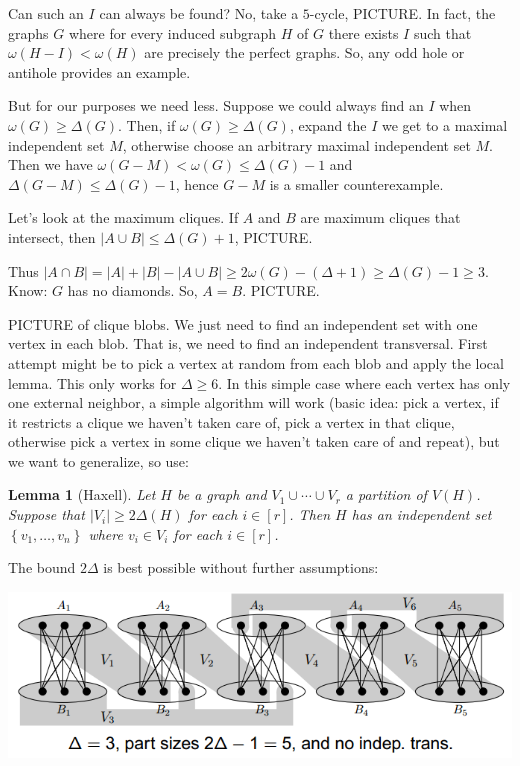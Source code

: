 \documentclass[12pt]{article}
\theoremstyle{plain}
\newtheorem{lem}[thm]{Lemma}
\theoremstyle{definition}
\theoremstyle{remark}
\newcommand{\set}[1]{\left\{ #1 \right\}}
\newcommand{\card}[1]{\left|#1\right|}
\newcommand{\irange}[1]{\left[#1\right]}
\begin{document}
Can such an $I$ can always be found?  No, take a $5$-cycle, PICTURE.  In fact, the graphs $G$ where for every induced subgraph $H$ of $G$ there exists $I$ such that $\omega(H-I) < \omega(H)$ are precisely the perfect graphs.  So, any odd hole or antihole provides an example.

\bigskip

But for our purposes we need less.  Suppose we could always find an $I$ when $\omega(G) \geq \Delta(G)$.  Then, if $\omega(G) \geq \Delta(G)$, expand the $I$ we get to a maximal independent set $M$, otherwise choose an arbitrary maximal independent set $M$.  Then we have $\omega(G-M) < \omega(G) \leq \Delta(G) - 1$ and $\Delta(G-M) \leq \Delta(G) - 1$,  hence $G-M$ is a smaller counterexample.

\bigskip

Let's look at the maximum cliques.  If $A$ and $B$ are maximum cliques that intersect, then $\card{A \cup B} \leq \Delta(G) + 1$, PICTURE. 

Thus $\card{A\cap B} = |A| + |B| - \card{A \cup B} \geq 2\omega(G) - (\Delta + 1) \geq \Delta(G) - 1 \geq 3$. Know: $G$ has no diamonds.  So, $A = B$. PICTURE.

\bigskip

PICTURE of clique blobs.  We just need to find an independent set with one vertex in each blob.  That is, we need to find an independent transversal.  First attempt might be to pick a vertex at random from each blob and apply the local lemma.  This only works for $\Delta \geq 6$.  In this simple case where each vertex has only one external neighbor, a simple algorithm will work (basic idea: pick a vertex, if it restricts a clique we haven't taken care of, pick a vertex in that clique, otherwise pick a vertex in some clique we haven't taken care of and repeat), but we want to generalize, so use:

\begin{lem}[Haxell]\label{HaxellLemma}
Let $H$ be a graph and $V_1 \cup \cdots \cup V_r$ a partition of $V(H)$. Suppose that $\card{V_i} \geq 2\Delta(H)$ for each $i \in \irange{r}$. Then $H$ has an independent set $\set{v_1, \ldots, v_n}$ where $v_i \in V_i$ for each $i \in \irange{r}$.
\end{lem}

The bound $2\Delta$ is best possible without further assumptions:

\begin{center}
\includegraphics{notransversal.PNG}
\end{center}
\end{document}
